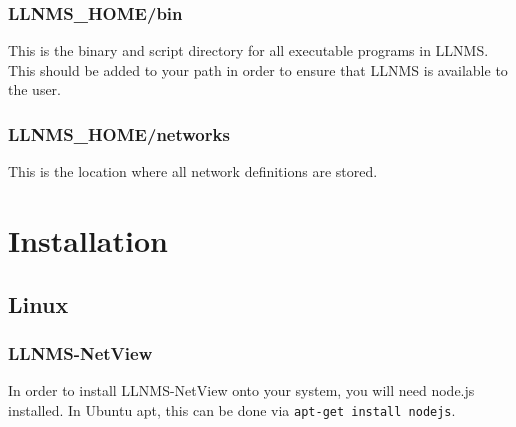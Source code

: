 \documentclass[12pt]{report}
\begin{document}
\subsubsection*{LLNMS\_HOME/bin}
This is the binary and script directory for all executable programs in LLNMS.  This
should be added to your path in order to ensure that LLNMS is available to the user.

\subsubsection*{LLNMS\_HOME/networks}
This is the location where all network definitions are stored.

\section*{Installation}

\subsection*{Linux}

\subsubsection*{LLNMS-NetView}
In order to install LLNMS-NetView onto your system, you will need node.js installed. In Ubuntu apt, 
this can be done via \texttt{apt-get install nodejs}.
\end{document}
